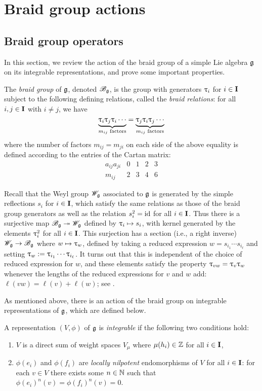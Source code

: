 \chapter{Braid group actions}

\section{Braid group operators}\label{sec:braid}

In this section, we review the action of the braid group of a simple Lie algebra $\mathfrak{g}$ on its integrable representations, and prove some important properties.

The \emph{braid group} of $\mathfrak{g}$, denoted $\mathscr{B}_{\mathfrak{g}}$, is the group with generators $\uptau_i$ for $i\in\mathbf{I}$ subject to the following defining relations, called the \emph{braid relations}: for all $i,j\in\mathbf{I}$ with $i\neq j$, we have
\[\underbrace{\uptau_i\uptau_j\uptau_i\cdots}_{m_{ij}\text{ factors}} = \underbrace{\uptau_j\uptau_i\uptau_j\cdots}_{m_{ij}\text{ factors}}\]
where the number of factors $m_{ij}=m_{ji}$ on each side of the above equality is defined according to the entries of the Cartan matrix:
\[\begin{array}{c|cccc}
    a_{ij}a_{ji} & 0 & 1 & 2 & 3 \\
    \hline
    m_{ij} & 2 & 3 & 4 & 6
\end{array}\]

Recall that the Weyl group $\mathscr{W}_{\mathfrak{g}}$ associated to $\mathfrak{g}$ is generated by the simple reflections $s_i$ for $i\in\mathbf{I}$, which satisfy the same relations as those of the braid group generators as well as the relation $s_i^2={\operatorname{id}}$ for all $i\in\mathbf{I}$.
Thus there is a surjective map $\mathscr{B}_{\mathfrak{g}}\twoheadrightarrow\mathscr{W}_{\mathfrak{g}}$ defined by $\uptau_i\mapsto s_i$, with kernel generated by the elements $\uptau_i^2$ for all $i\in\mathbf{I}$.
This surjection has a section (i.e., a right inverse) $\mathscr{W}_{\mathfrak{g}}\to\mathscr{B}_{\mathfrak{g}}$ where $w\mapsto\uptau_w$, defined by taking a reduced expression $w=s_{i_1}\cdots s_{i_\ell}$ and setting $\uptau_w:=\uptau_{i_1}\cdots\uptau_{i_\ell}$.
It turns out that this is independent of the choice of reduced expression for $w$, and these elements satisfy the property $\uptau_{vw}=\uptau_v\uptau_w$ whenever the lengths of the reduced expressions for $v$ and $w$ add: $\ell(vw)=\ell(v)+\ell(w)$; see \cite[\S2.1.2]{lusztig_introduction_2010}.

As mentioned above, there is an action of the braid group on integrable representations of $\mathfrak{g}$, which are defined below.

\begin{definition}\label{D:integrable}
    A representation $(V,\phi)$ of $\mathfrak{g}$ is \emph{integrable} if the following two conditions hold:
    \begin{enumerate}
        \item $V$ is a direct sum of weight spaces $V_\mu$ where $\mu(h_i)\in\mathbb{Z}$ for all $i\in\mathbf{I}$,
        \item $\phi(e_i)$ and $\phi(f_i)$ are \emph{locally nilpotent} endomorphisms of $V$ for all $i\in\mathbf{I}$: for each $v\in V$ there exists some $n\in\mathbb{N}$ such that $\phi(e_i)^n(v)=\phi(f_i)^n(v)=0$.
    \end{enumerate}
\end{definition}

